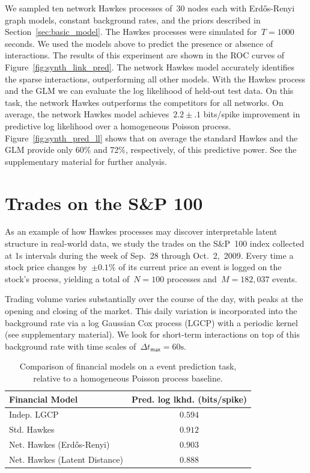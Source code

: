 We sampled ten network Hawkes processes of~$30$ nodes each with
Erd\H{o}s-Renyi graph models, constant background rates, and the
priors described in Section~\ref{sec:basic_model}. The Hawkes
processes were simulated for~${T=1000}$ seconds. We used the models
above to predict the presence or absence of interactions. The results
of this experiment are shown in the ROC curves of
Figure~\ref{fig:synth_link_pred}. The network Hawkes model accurately
identifies the sparse interactions, outperforming all other models.
With the Hawkes process and the GLM we can evaluate the log likelihood
of held-out test data. On this task, the network Hawkes outperforms
the competitors for all networks. On average, the network Hawkes model
achieves~$2.2\pm.1$ bits/spike improvement in predictive log
likelihood over a homogeneous Poisson
process. Figure~\ref{fig:synth_pred_ll} shows that on average the
standard Hawkes and the GLM provide only 60\% and 72\%, respectively,
of this predictive power. See the supplementary material for further
analysis.

\section{Trades on the S\&P 100}
\label{sec:financial}
As an example of how Hawkes processes may discover interpretable
latent structure in real-world data, we study the trades on the
S\&P~100 index collected at 1s intervals during the week of Sep.~28
through Oct.~2,~2009. Every time a stock price changes by~${\pm0.1\%}$
of its current price an event is logged on the stock's process,
yielding a total of~${N=100}$ processes and~${M=182,037}$ events.

Trading volume varies substantially over the course of the day, with
peaks at the opening and closing of the market. This daily variation
is incorporated into the background rate via a log Gaussian Cox
process (LGCP) with a periodic kernel (see supplementary material). We
look for short-term interactions on top of this background rate with
time scales of~${\Delta t_{\textsf{max}}=60\mathrm{s}}$.

\begin{table}
  \begin{center}
    \begin{tabular}{l|c}
      \textbf{Financial Model} & \textbf{Pred. log lkhd. (bits/spike)} \\
      \hline
      Indep. LGCP & $0.594$ \\
      Std. Hawkes & $0.912$ \\
      Net. Hawkes (Erd\H{o}s-Renyi) & $0.903$ \\
      Net. Hawkes (Latent Distance) & $0.888$ \\
    \end{tabular}
  \end{center}
    \caption{Comparison of financial models on a event prediction task, relative to a homogeneous Poisson process baseline.}
    \label{tab:financial_pred_ll}
\end{table}

